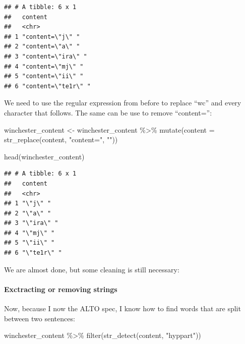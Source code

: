 \documentclass[
]{article}
\newenvironment{Shaded}{\begin{snugshade}}{\end{snugshade}}
\newcommand{\AttributeTok}[1]{\textcolor[rgb]{0.77,0.63,0.00}{#1}}
\newcommand{\FunctionTok}[1]{\textcolor[rgb]{0.00,0.00,0.00}{#1}}
\newcommand{\NormalTok}[1]{#1}
\newcommand{\OtherTok}[1]{\textcolor[rgb]{0.56,0.35,0.01}{#1}}
\newcommand{\SpecialCharTok}[1]{\textcolor[rgb]{0.00,0.00,0.00}{#1}}
\newcommand{\StringTok}[1]{\textcolor[rgb]{0.31,0.60,0.02}{#1}}
\begin{document}
\begin{verbatim}
## # A tibble: 6 x 1
##   content            
##   <chr>              
## 1 "content=\"j\" "   
## 2 "content=\"a\" "   
## 3 "content=\"ira\" " 
## 4 "content=\"mj\" "  
## 5 "content=\"ii\" "  
## 6 "content=\"te1r\" "
\end{verbatim}

We need to use the regular expression from before to replace ``wc'' and every character that follows.
The same can be use to remove ``content='':

\begin{Shaded}
\begin{Highlighting}[]
\NormalTok{winchester\_content }\OtherTok{\textless{}{-}}\NormalTok{ winchester\_content }\SpecialCharTok{\%\textgreater{}\%} 
  \FunctionTok{mutate}\NormalTok{(}\AttributeTok{content =} \FunctionTok{str\_replace}\NormalTok{(content, }\StringTok{"content="}\NormalTok{, }\StringTok{""}\NormalTok{))}

\FunctionTok{head}\NormalTok{(winchester\_content)}
\end{Highlighting}
\end{Shaded}

\begin{verbatim}
## # A tibble: 6 x 1
##   content    
##   <chr>      
## 1 "\"j\" "   
## 2 "\"a\" "   
## 3 "\"ira\" " 
## 4 "\"mj\" "  
## 5 "\"ii\" "  
## 6 "\"te1r\" "
\end{verbatim}

We are almost done, but some cleaning is still necessary:

\hypertarget{exctracting-or-removing-strings}{%
\paragraph{Exctracting or removing strings}\label{exctracting-or-removing-strings}}

Now, because I now the ALTO spec, I know how to find words that are split between two sentences:

\begin{Shaded}
\begin{Highlighting}[]
\NormalTok{winchester\_content }\SpecialCharTok{\%\textgreater{}\%} 
  \FunctionTok{filter}\NormalTok{(}\FunctionTok{str\_detect}\NormalTok{(content, }\StringTok{"hyppart"}\NormalTok{))}
\end{Highlighting}
\end{Shaded}
\end{document}

